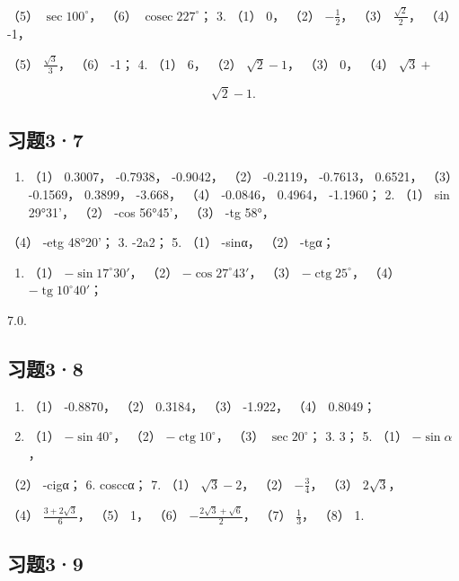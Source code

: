 （5） \(\sec 100^{\circ}\)， （6）
\(\operatorname{cosec} 227^{\circ}\)； 3. （1） 0， （2）
\(-\frac{1}{2}\)， （3） \(\frac{\sqrt{2}}{2}\)， （4） -1，

（5） \(\frac{\sqrt{3}}{3}\)， （6） -1； 4. （1） 6， （2）
\(\sqrt{2} - 1\)， （3） 0， （4） \(\sqrt{3} +\)

\[
\sqrt {2} - 1.
\]

\subsection{习题3·7}

\begin{enumerate}
\item
  （1） 0.3007， -0.7938， -0.9042， （2） -0.2119， -0.7613， 0.6521，
  （3） -0.1569， 0.3899， -3.668， （4） -0.0846， 0.4964， -1.1960；
  2. （1） sin 29°31'， （2） -cos 56°45'， （3） -tg 58°，
\end{enumerate}

（4） -etg 48°20'； 3. -2a2； 5. （1） -sinα， （2） -tgα；

\begin{enumerate}[start=6]
\item
  （1） \(-\sin17^{\circ}30'\)， （2） \(-\cos27^{\circ}43'\)， （3）
  \(-\operatorname{ctg}25^{\circ}\)， （4）
  \(-\operatorname{tg}10^{\circ}40'\)；
\end{enumerate}

7.0.

\subsection{习题3·8}

\begin{enumerate}
\item
  （1） -0.8870， （2） 0.3184， （3） -1.922， （4） 0.8049；
\item
  （1） \(-\sin40^{\circ}\)， （2） \(-\operatorname{ctg}10^{\circ}\)，
  （3） \(\sec20^{\circ}\)； 3. 3； 5. （1） \(-\sin\alpha\)，
\end{enumerate}

（2） -cigα； 6. cosccα； 7. （1） \(\sqrt{3} - 2\)， （2）
\(-\frac{3}{4}\)， （3） \(2\sqrt{3}\)，

（4） \(\frac{3 + 2\sqrt{3}}{6}\)， （5） 1， （6）
\(-\frac{2\sqrt{3} + \sqrt{6}}{2}\)， （7） \(\frac{1}{3}\)， （8） 1.

\subsection{习题3·9}

